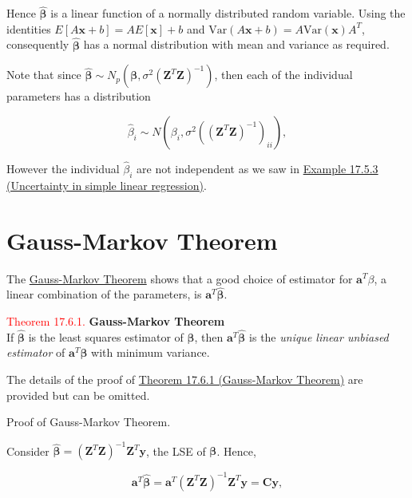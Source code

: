 \documentclass[
]{book}
\begin{document}
Hence \(\mathbf{\hat{\beta}}\) is a linear function of a normally distributed random variable. Using the identities \(E[A \mathbf{x} + b] = A E[\mathbf{x}] + b\) and \(\text{Var}(A \mathbf{x} + b) = A \text{Var}(\mathbf{x}) A^{T}\), consequently \(\mathbf{\hat{\beta}}\) has a normal distribution with mean and variance as required.

\hfill\break

Note that since \(\mathbf{\hat{\beta}} \sim N_p(\mathbf{\beta},\sigma^2(\mathbf{Z}^T\mathbf{Z})^{-1})\), then each of the individual parameters has a distribution

\[\hat{\beta}_i \sim N \left( \beta_i, \sigma^2 ((\mathbf{Z}^T\mathbf{Z})^{-1})_{ii} \right),\]

However the individual \(\hat{\beta}_i\) are not independent as we saw in \protect\hyperlink{Sec_Linear_LSE:ex:uncertain}{Example 17.5.3 (Uncertainty in simple linear regression)}.

\hypertarget{Sec_Linear_LSE:GaussMarkov}{%
\section{Gauss-Markov Theorem}\label{Sec_Linear_LSE:GaussMarkov}}

The \protect\hyperlink{Sec_Linear_LSE:thm:GaussMarkov}{Gauss-Markov Theorem} shows that a good choice of estimator for \(\mathbf{a}^T \beta\), a linear combination of the parameters, is \(\mathbf{a}^T\mathbf{\hat{\beta}}\).

\leavevmode{}%
\textcolor{red}{Theorem 17.6.1.}
{\textbf{Gauss-Markov Theorem}}\\
If \(\mathbf{\hat{\beta}}\) is the least squares estimator of \(\mathbf{\beta}\), then \(\mathbf{a}^T \mathbf{\hat{\beta}}\) is the \emph{unique linear unbiased estimator} of \(\mathbf{a}^T\mathbf{\beta}\) with minimum variance.

The details of the proof of \protect\hyperlink{Sec_Linear_LSE:thm:GaussMarkov}{Theorem 17.6.1 (Gauss-Markov Theorem)} are provided but can be omitted.

Proof of Gauss-Markov Theorem.

Consider \(\mathbf{\hat{\beta}} = (\mathbf{Z}^T\mathbf{Z})^{-1} \mathbf{Z}^T\mathbf{y}\), the LSE of \(\mathbf{\beta}\). Hence,

\[\mathbf{a}^T\mathbf{\hat{\beta}} = \mathbf{a}^T (\mathbf{Z}^T\mathbf{Z})^{-1} \mathbf{Z}^T \mathbf{y} = \mathbf{C}\mathbf{y},\]
\end{document}
